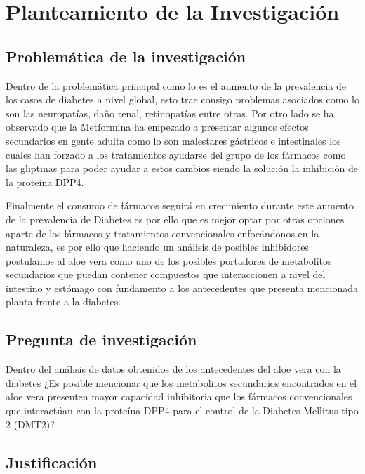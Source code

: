 \chapter{Planteamiento de la Investigación}
\renewcommand{\figurename}{Figura} 

\section{Problemática de la investigación}

Dentro de la problemática principal como lo es el aumento de la prevalencia de los casos de diabetes a nivel global, esto trae consigo problemas asociados como lo son las neuropatías, daño renal, retinopatías entre otras.%
Por otro lado se ha observado que la Metformina ha empezado a presentar algunos efectos secundarios en gente adulta como lo son malestares gástricos e intestinales los cuales han forzado a los tratamientos ayudarse del grupo de los fármacos como las gliptinas para poder ayudar a estos cambios siendo la solución la inhibición de la proteína DPP4.

Finalmente el consumo de fármacos seguirá en crecimiento durante este aumento de la prevalencia de Diabetes es por ello que es mejor optar por otras opciones aparte de los fármacos y tratamientos convencionales enfocándonos en la naturaleza, es por ello que haciendo un análisis de posibles inhibidores postulamos al aloe vera como uno de los posibles portadores de metabolitos secundarios que puedan contener compuestos que interaccionen a nivel del intestino y estómago con fundamento a los antecedentes que presenta mencionada planta frente a la diabetes.

\section{Pregunta de investigación}
Dentro del análisis de datos obtenidos de los antecedentes del aloe vera con la diabetes ¿Es posible mencionar que los metabolitos secundarios encontrados en el aloe vera presenten mayor capacidad inhibitoria que los  fármacos convencionales que interactúan con la proteína DPP4 para el control de la Diabetes Mellitus tipo 2 (DMT2)?

\section{Justificación}


